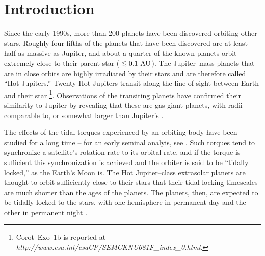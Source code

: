 \documentclass[12pt,preprint]{aastex}
\def\lsim{\;\rlap{\lower 2.5pt
   \hbox{$\sim$}}\raise 1.5pt\hbox{$<$}\;}
\begin{document}

\section{Introduction}
\label{sec:intro}
Since the early 1990s, more than 200 planets have been discovered orbiting
other stars.
Roughly four fifths of the planets that have been discovered are at least half
as massive as Jupiter, and about a quarter of the known planets 
orbit extremely close to their parent star ($\lsim 0.1 {\rm~AU}$).
The Jupiter--mass planets that are in close orbits are highly irradiated by
their stars and are therefore called ``Hot Jupiters.''
Twenty Hot Jupiters transit along the line of sight between Earth and
their star
\citep{charbonneau_et_al2000, henry_et_al2000, konacki_et_al2003,
bouchy_et_al2004, pont_et_al2004, konacki_et_al2004, konacki_et_al2005,
udalski_et_al2002a, udalski_et_al2002b, udalski_et_al2002c, udalski_et_al2003,
udalski_et_al2004, alonso_et_al2004, bouchy_et_al2005, mccullough_et_al2006,
odonovan_et_al2006b, bakos_et_al2006, collier_et_al2006, burke_et_al2007,
gillon_et_al2007, bakos_et_al2007a, bakos_et_al2007bb,
johnskrull_et_al2007}\footnote{Corot--Exo--1b is reported at
{\it http://www.esa.int/esaCP/SEMCKNU681F\_index\_0.html}.}.
Observations of the transiting planets have confirmed
their similarity to Jupiter by revealing that these are gas giant planets,
with radii comparable to, or somewhat larger than Jupiter's
\citep{charbonneau_et_al2000, henry_et_al2000, gaudi2005}.

The effects of the tidal torques experienced by an orbiting body have
been studied for a long time -- for an early seminal analyis, see
\citet{goldreich+peale1966}.  Such torques
tend to synchronize a satellite's rotation rate to its orbital rate, and
if the torque is sufficient this synchronization is achieved and the
orbiter is said to be ``tidally locked,'' as the Earth's Moon is.  The
Hot Jupiter--class extrasolar planets are thought to orbit sufficiently
close to their stars that their tidal locking timescales are much shorter
than the ages of the planets.  The planets, then, are expected to be
tidally locked to the stars, with one hemisphere in permanent day and
the other in permanent night \citep{harrington_et_al2006}.
\end{document}
